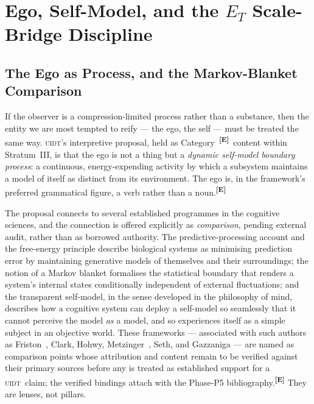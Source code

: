 \documentclass[12pt,a4paper,twoside]{article}
\theoremstyle{plain}
\theoremstyle{definition}
\theoremstyle{remark}
\newcommand{\UIDT}{\textsc{uidt}}
\newcommand{\catmark}[1]{\textsuperscript{\textsf{\textbf{[#1]}}}}
\begin{document}
\section{Ego, Self-Model, and the \texorpdfstring{$E_T$}{E\_T} Scale-Bridge Discipline}
\label{sec:ego-selfmodel-et}

\subsection{The Ego as Process, and the Markov-Blanket Comparison}
\label{subsec:ego-as-process}

If the observer is a compression-limited process rather than a
substance, then the entity we are most tempted to reify --- the ego, the
self --- must be treated the same way. \UIDT's interpretive proposal,
held as Category~\catmark{E}\ content within Stratum~III, is that the
ego is not a thing but a \emph{dynamic self-model boundary process}: a
continuous, energy-expending activity by which a subsystem maintains a
model of itself as distinct from its environment. The ego is, in the
framework's preferred grammatical figure, a verb rather than a
noun.\catmark{E}

The proposal connects to several established programmes in the cognitive
sciences, and the connection is offered explicitly as \emph{comparison},
pending external audit, rather than as borrowed authority. The
predictive-processing account and the free-energy principle describe
biological systems as minimising prediction error by maintaining
generative models of themselves and their surroundings; the notion of a
Markov blanket formalises the statistical boundary that renders a
system's internal states conditionally independent of external
fluctuations; and the transparent self-model, in the sense developed in
the philosophy of mind, describes how a cognitive system can deploy a
self-model so seamlessly that it cannot perceive the model \emph{as} a
model, and so experiences itself as a simple subject in an objective
world. These frameworks --- associated with such authors as Friston~\cite{friston2010},
Clark, Hohwy, Metzinger~\cite{metzinger2003}, Seth, and Gazzaniga --- are named as comparison
points whose attribution and content remain to be verified against their
primary sources before any is treated as established support for a
\UIDT\ claim; the verified bindings attach with the Phase-P5
bibliography.\catmark{E} They are lenses, not pillars.
\end{document}
